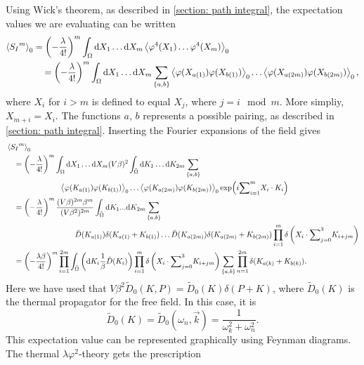 Using Wick's theorem, as described in \autoref{section: path integral}, the expectation values we are evaluating can be written
\begin{align*}
    \left\langle {S_I}^m \right\rangle_0 & 
    = \left(- \frac{\lambda }{4!}\right)^m 
    \int_{\Omega} \dd X_1 \dots \dd X_m
    \left\langle \varphi^4(X_1) \dots \varphi^4(X_m) \right\rangle_0 \\ 
    & \quad
    = \left(- \frac{\lambda }{4!}\right)^m 
    \int_{\Omega} \dd X_1 \dots \dd X_m \sum_{\{a, b\}}
    \left\langle \varphi(X_{a(1)}) \varphi(X_{b(1)}) \right\rangle_0
    \dots
    \left\langle \varphi(X_{a(2m)}) \varphi(X_{b(2m)}) \right\rangle_0,
\end{align*}
%
where $X_i$ for $i>m$ is defined to equal $X_j$, where $j = i \mod m$.
More simpliy,  $X_{m + i} = X_i$.
The functions $a,\,b$ represents a possible pairing, as described in \autoref{section: path integral}.
Inserting the Fourier expansions of the field gives
\begin{align*}
    & \left\langle {S_I}^m \right\rangle_0 \\
    &\quad 
    = \left(-\frac{\lambda }{4!}\right)^m 
    \int_{\Omega} \dd X_1 \dots \dd X_m
    (V \beta)^2 \int_{\tilde \Omega} \dd K_1 \dots \dd K_{2m} \sum_{\{a, b\}} \\
    & \quad \quad \quad \quad\quad \quad \quad
    \left\langle \varphi(K_{a(1)}) \varphi(K_{b(1)}) \right\rangle_0
    \dots
    \left\langle \varphi(K_{a(2m)}) \varphi(K_{b(2m)}) \right\rangle_0     
    \exp(i {\sum}_{i=1}^{m} X_i \cdot K_i)\\ 
    & \quad  
    = \left(-\frac{\lambda }{4!}\right)^m 
    \frac{(V \beta)^{2m} \beta^m}{(V \beta^2)^{2m}}
    \int_{\tilde \Omega} \dd K_1 ... \dd K_{2m} \sum_{\{a, b\}} \\
    & \quad \quad \quad \quad \quad \quad \quad \quad \quad
    \tilde D(K_{a(1)}) \delta(K_{a(1)} + K_{b(1)}) \dots 
    \tilde D(K_{a(2m)}) \delta(K_{a(2m)} + K_{b(2m)})
    \prod_{i=1}^m \delta\left(X_i \cdot {\sum}_{j=0}^3 K_{i + jm}\right) \\
    & \quad 
    = \left(-\frac{\lambda \beta}{4!}\right)^m 
    \prod_{i=1}^{2m} \int_{\tilde \Omega} 
    \left( \dd K_i \frac{1}{\beta} \tilde D(K_i)  \right) 
    \prod_{i=1}^m \delta\left(X_i \cdot {\sum}_{j=0}^3 K_{i + jm}\right)
    \sum_{\{a, b\}} 
    \prod_{n=1}^{2m}\delta(K_{a(k)} + K_{b(k)}).
\end{align*}
%
Here we have used that $V \beta^2 \tilde D_0(K, P) = \tilde D_0(K) \delta(P + K)$, where $\tilde D_0(K)$ is the thermal propagator for the free field.
In this case, it is
\begin{equation}
    \tilde D_0(K) = \tilde D_0(\omega_n, \vec k) = \frac{1}{\omega_k^2 + \omega_n^2}.
\end{equation}
%
This expectation value can be represented graphically using Feynman diagrams.
The thermal $\lambda \varphi^2$-theory gets the prescription

